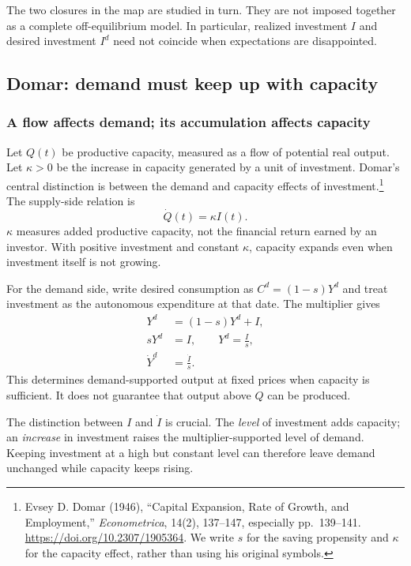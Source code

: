The two closures in the map are studied in turn. They are not imposed together
as a complete off-equilibrium model. In particular, realized investment $I$ and
desired investment $I^d$ need not coincide when expectations are disappointed.

\subsection{Domar: demand must keep up with capacity}

\subsubsection{A flow affects demand; its accumulation affects capacity}

Let $Q(t)$ be productive capacity, measured as a flow of potential real output.
Let $\kappa>0$ be the increase in capacity generated by a unit of investment.
Domar's central distinction is between the demand and capacity effects of
investment.\footnote{Evsey D. Domar (1946), ``Capital Expansion, Rate of Growth,
and Employment,'' \textit{Econometrica}, 14(2), 137--147, especially pp.~139--141.
\url{https://doi.org/10.2307/1905364}. We write $s$ for the saving propensity
and $\kappa$ for the capacity effect, rather than using his original symbols.}
The supply-side relation is
\begin{equation}\label{eq:domar-capacity}
\dot Q(t)=\kappa I(t).
\end{equation}
$\kappa$ measures added productive capacity, not the financial return earned by
an investor. With positive investment and constant $\kappa$, capacity expands
even when investment itself is not growing.

For the demand side, write desired consumption as $C^d=(1-s)Y^d$ and treat
investment as the autonomous expenditure at that date. The multiplier gives
\begin{align}
Y^d&=(1-s)Y^d+I,\\
sY^d&=I,\qquad Y^d=\frac{I}{s},\\
\dot Y^d&=\frac{\dot I}{s}.\label{eq:domar-demand}
\end{align}
This determines demand-supported output at fixed prices when capacity is
sufficient. It does not guarantee that output above $Q$ can be produced.

The distinction between $I$ and $\dot I$ is crucial. The \emph{level} of
investment adds capacity; an \emph{increase} in investment raises the
multiplier-supported level of demand. Keeping investment at a high but
constant level can therefore leave demand unchanged while capacity keeps rising.


